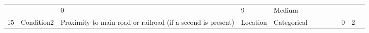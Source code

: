 \documentclass[11pt]{article}
\begin{document}
\begin{longtable}[]{@{}llllllllllll@{}}
\begin{minipage}[t]{0.04\columnwidth}
\strut
\end{minipage} & \begin{minipage}[t]{0.04\columnwidth}\raggedright\strut
\strut
\end{minipage} & \begin{minipage}[t]{0.04\columnwidth}\raggedright\strut
0\strut
\end{minipage} & \begin{minipage}[t]{0.04\columnwidth}\raggedright\strut
9\strut
\end{minipage} & \begin{minipage}[t]{0.04\columnwidth}\raggedright\strut
Medium\strut
\end{minipage}\tabularnewline
\begin{minipage}[t]{0.04\columnwidth}\raggedright\strut
15\strut
\end{minipage} & \begin{minipage}[t]{0.04\columnwidth}\raggedright\strut
Condition2\strut
\end{minipage} & \begin{minipage}[t]{0.04\columnwidth}\raggedright\strut
Proximity to main road or railroad (if a second is present)\strut
\end{minipage} & \begin{minipage}[t]{0.04\columnwidth}\raggedright\strut
Location\strut
\end{minipage} & \begin{minipage}[t]{0.04\columnwidth}\raggedright\strut
Categorical\strut
\end{minipage} & \begin{minipage}[t]{0.04\columnwidth}\raggedright\strut
\strut
\end{minipage} & \begin{minipage}[t]{0.04\columnwidth}\raggedright\strut
\strut
\end{minipage} & \begin{minipage}[t]{0.04\columnwidth}\raggedright\strut
\strut
\end{minipage} & \begin{minipage}[t]{0.04\columnwidth}\raggedright\strut
\strut
\end{minipage} & \begin{minipage}[t]{0.04\columnwidth}\raggedright\strut
0\strut
\end{minipage} & \begin{minipage}[t]{0.04\columnwidth}\raggedright\strut
2\strut
\end{minipage} & \begin{minipage}[t]{0.04\columnwidth}\raggedright\strut

\end{minipage}
\end{longtable}
\end{document}
